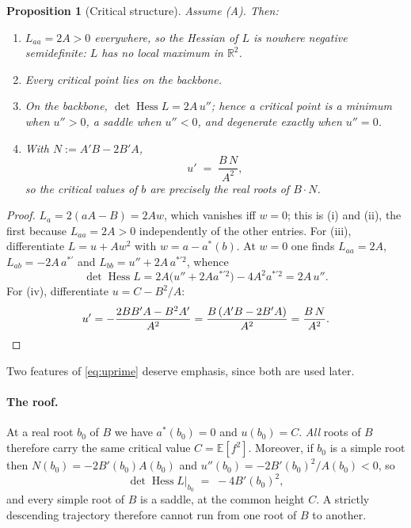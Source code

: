 \documentclass[11pt]{article}
\theoremstyle{plain}
\newtheorem{proposition}[theorem]{Proposition}
\theoremstyle{definition}
\theoremstyle{remark}
\newcommand{\R}{\mathbb{R}}
\newcommand{\E}{\mathbb{E}}
\begin{document}
\begin{proposition}[Critical structure]\label{prop:critical}
Assume \textup{(A)}. Then:
\begin{enumerate}
\item[(i)] $L_{aa} = 2A > 0$ everywhere, so the Hessian of $L$ is nowhere
  negative semidefinite: $L$ has no local maximum in $\R^2$.
\item[(ii)] Every critical point lies on the backbone.
\item[(iii)] On the backbone, $\det \operatorname{Hess} L = 2A\,u''$; hence a
  critical point is a minimum when $u'' > 0$, a saddle when $u'' < 0$, and
  degenerate exactly when $u'' = 0$.
\item[(iv)] With $N := A'B - 2B'A$,
  \begin{equation}\label{eq:uprime}
    u' \;=\; \frac{B\,N}{A^2},
  \end{equation}
  so the critical values of $b$ are precisely the real roots of $B\cdot N$.
\end{enumerate}
\end{proposition}

\begin{proof}
$L_a = 2(aA - B) = 2Aw$, which vanishes iff $w = 0$; this is (i) and (ii),
the first because $L_{aa} = 2A > 0$ independently of the other entries.
For (iii), differentiate $L = u + Aw^2$ with $w = a - a^*(b)$. At $w = 0$ one
finds $L_{aa} = 2A$, $L_{ab} = -2A\,a^{*\prime}$ and $L_{bb} = u'' + 2A\,
a^{*\prime 2}$, whence
\[
  \det\operatorname{Hess}L = 2A\bigl(u'' + 2A a^{*\prime 2}\bigr) - 4A^2
  a^{*\prime 2} = 2A\,u''.
\]
For (iv), differentiate $u = C - B^2/A$:
\[
  u' = -\frac{2BB'A - B^2A'}{A^2} = \frac{B\,(A'B - 2B'A)}{A^2}
     = \frac{B\,N}{A^2}. \qedhere
\]
\end{proof}

Two features of \eqref{eq:uprime} deserve emphasis, since both are used later.

\paragraph{The roof.} At a real root $b_0$ of $B$ we have $a^*(b_0) = 0$ and
$u(b_0) = C$. \emph{All} roots of $B$ therefore carry the same critical value
$C = \E[f^2]$. Moreover, if $b_0$ is a simple root then
$N(b_0) = -2B'(b_0)A(b_0)$ and $u''(b_0) = -2B'(b_0)^2/A(b_0) < 0$, so
\begin{equation}\label{eq:Bsaddle}
  \det \operatorname{Hess} L\big|_{b_0} \;=\; -4B'(b_0)^2 ,
\end{equation}
and every simple root of $B$ is a saddle, at the common height $C$. A strictly
descending trajectory therefore cannot run from one root of $B$ to another.
\end{document}
